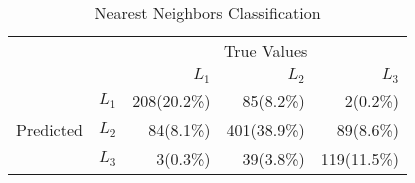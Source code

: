 \begin{table}
\centering
  \caption{Nearest Neighbors Classification}
  \begin{tabular}{rrrrr}
    \toprule
    & &\multicolumn{3}{c}{True Values}\\
    & & ${L_1}$ & ${L_2}$ & ${L_3}$ \\
    \multirow{3}{*}{Predicted} & ${L_1}$ & 208(20.2\%) & 85(8.2\%) & 2(0.2\%) \\
    & ${L_2}$ & 84(8.1\%) & 401(38.9\%) & 89(8.6\%) \\
    & ${L_3}$ & 3(0.3\%) & 39(3.8\%) & 119(11.5\%) \\\bottomrule
  \end{tabular}
\end{table}
